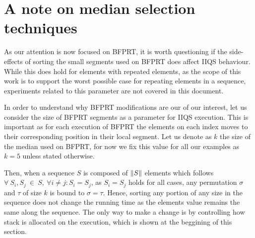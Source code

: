 \section{A note on median selection techniques}
\label{SECTION:NOTE_ON_MEDIAN_SELECTION}
As our attention is now focused on BFPRT, it is worth questioning if the side-effects of sorting the small segments used on BFPRT does affect IIQS behaviour. While this does hold for elements with repeated elements, as the scope of this work is to support the worst possible case for repeating elements in a sequence, experiments related to this parameter are not covered in this document.

In order to understand why BFPRT modifications are our of our interest, let us consider the size of BFPRT segments as a parameter for IIQS execution. This is important as for each execution of BFPRT the elements on each index moves to their corresponding position in their local segment. Let us denote as $k$ the size of the median used on BFPRT, for now we fix this value for all our examples as $k=5$ unless stated otherwise.

Then, when a sequence $S$ is composed of $\lVert S\rVert$ elements which follows $\forall~S_i, S_j~\in~S,~\forall i \neq j : S_i=S_j$, as $S_i=S_j$ holds for all cases, any permutation $\sigma$ and $\tau$ of size $k$ is bound to $\sigma = \tau$. Hence, sorting any portion of any size in the sequence does not change the running time as the elements value remains the same along the sequence. The only way to make a change is by controlling how stack is allocated on the execution, which is shown at the beggining of this section.

\FloatBarrier